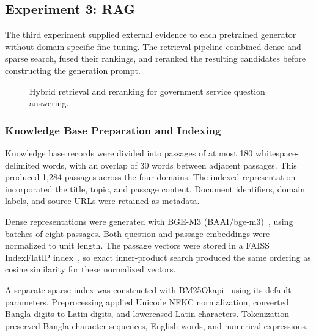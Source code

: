 \documentclass[10pt,journal,compsoc]{IEEEtran}
\begin{document}
\subsection{Experiment 3: RAG}
\label{exp:3}

The third experiment supplied external evidence to each pretrained generator without domain-specific fine-tuning. The retrieval pipeline combined dense and sparse search, fused their rankings, and reranked the resulting candidates before constructing the generation prompt.

\begin{figure}[!t]
\centering
\caption{Hybrid retrieval and reranking for government service question answering.}
\label{fig:hybrid_retrieval}
\end{figure}

\subsubsection{Knowledge Base Preparation and Indexing}

Knowledge base records were divided into passages of at most 180 whitespace-delimited words, with an overlap of 30 words between adjacent passages. This produced 1,284 passages across the four domains. The indexed representation incorporated the title, topic, and passage content. Document identifiers, domain labels, and source URLs were retained as metadata.

Dense representations were generated with BGE-M3 (BAAI/bge-m3)~\cite{meth_chen2024bgem3}, using batches of eight passages. Both question and passage embeddings were normalized to unit length. The passage vectors were stored in a FAISS IndexFlatIP index~\cite{meth_johnson2019faiss}, so exact inner-product search produced the same ordering as cosine similarity for these normalized vectors.

A separate sparse index was constructed with BM25Okapi~\cite{meth_robertson2009bm25} using its default parameters. Preprocessing applied Unicode NFKC normalization, converted Bangla digits to Latin digits, and lowercased Latin characters. Tokenization preserved Bangla character sequences, English words, and numerical expressions.
\end{document}
